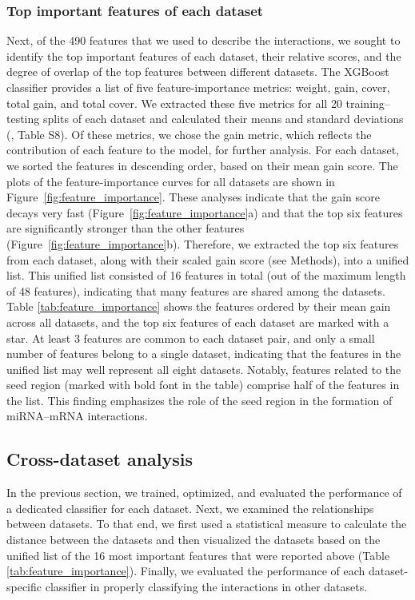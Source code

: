 \documentclass{bmcart}
\begin{document}
\subsubsection*{Top important features of each dataset}
Next, of the 490 features that we used to describe the interactions, we sought to identify the top important features of each dataset, their relative scores, and the degree of overlap of the top features between different datasets. The XGBoost classifier provides a list of five feature-importance metrics: weight, gain, cover, total gain, and total cover. We extracted these five metrics for all 20 training--testing splits of each dataset and calculated their means and standard deviations (, Table S8).
Of these metrics, we chose the gain metric, which reflects the contribution of each feature to the model, for further analysis. For each dataset, we sorted the features in descending order, based on their mean gain score. The plots of the feature-importance curves for all datasets are shown in Figure~\ref{fig:feature_importance}.
These analyses indicate that the gain score decays very fast (Figure~\ref{fig:feature_importance}a) and that the top six features are significantly stronger than the other features (Figure~\ref{fig:feature_importance}b). Therefore, we extracted the top six features from each dataset, along with their scaled gain score (see Methods), into a unified list. This unified list consisted of 16 features in total (out of the maximum length of 48 features), indicating that many features are shared among the datasets. Table \ref{tab:feature_importance} shows the features ordered by their mean gain across all datasets, and the top six features of each dataset are marked with a star. At least 3 features are common to each dataset pair, and only a small number of features belong to a single dataset, indicating that the features in the unified list may well represent all eight datasets.
Notably, features related to the seed region (marked with bold font in the table) comprise half of the features in the list. This finding emphasizes the role of the seed region in the formation of miRNA--mRNA interactions.



\subsection*{Cross-dataset analysis}
In the previous section, we trained, optimized, and evaluated the performance of a dedicated classifier for each dataset. Next, we examined the relationships between datasets. To that end, we first used a statistical measure to calculate the distance between the datasets and then visualized the datasets based on the unified list of the 16 most important features that were reported above (Table \ref{tab:feature_importance}). Finally, we evaluated the performance of each dataset-specific classifier in properly classifying the interactions in other datasets.
\end{document}

